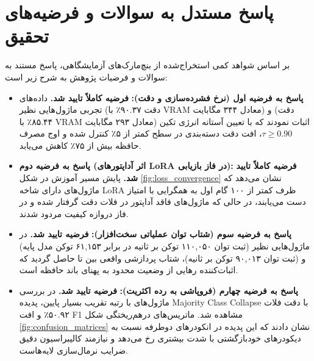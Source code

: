 \documentclass[12pt,a4paper]{report}
\theoremstyle{definition}
\begin{document}
\section{پاسخ مستدل به سوالات و فرضیه‌های تحقیق}
بر اساس شواهد کمی استخراج‌شده از بنچ‌مارک‌های آزمایشگاهی، پاسخ مستند به سوالات و فرضیات پژوهش به شرح زیر است:

\begin{itemize}
    \item \textbf{پاسخ به فرضیه اول (نرخ فشرده‌سازی و دقت):}
    \textbf{فرضیه کاملاً تایید شد.} داده‌های تجربی ماژول‌هایی نظیر  (دقت ۹۰.۳۷٪ با VRAM معادل ۳۴۴ مگابایت) و  (دقت ۸۵.۴۴٪ با VRAM معادل ۲۹۳ مگابایت) اثبات نمودند که با تعیین آستانه انرژی تکین $\tau \ge 0.90$، افت دقت دسته‌بندی در سطح کمتر از ۵٪ کنترل شده و اوج مصرف حافظه بیش از ۷۵٪ کاهش می‌یابد.

    \item \textbf{پاسخ به فرضیه دوم (اثر آداپتورهای LoRA در فاز بازیابی):}
    \textbf{فرضیه کاملاً تایید شد.} پایش مسیر آموزش در شکل \ref{fig:loss_convergence} نشان می‌دهد که ماژول‌های دارای شاخه LoRA ظرف کمتر از ۱۰۰ گام اول به همگرایی با امتیاز  دست می‌یابند، در حالی که ماژول‌های فاقد آداپتور در فلات دقت گرفتار شده و در فاز دروازه کیفیت مردود شدند.

    \item \textbf{پاسخ به فرضیه سوم (شتاب توان عملیاتی سخت‌افزار):}
    \textbf{فرضیه تایید شد.} در ماژول‌هایی نظیر  (ثبت توان ۱۱۰,۰۵۰ توکن بر ثانیه در برابر ۶۱,۱۵۳ توکن مدل پایه) و  (ثبت توان ۹۰,۰۱۳ توکن بر ثانیه)، شتاب پردازشی واقعی بین  تا  حاصل گردید که اثبات‌کننده رهایی از وضعیت محدود به پهنای باند حافظه  است.

    \item \textbf{پاسخ به فرضیه چهارم (فروپاشی به رده اکثریت):}
    \textbf{فرضیه تایید شد.} در بررسی ماژول‌های با رتبه تقریب بسیار پایین، پدیده Majority Class Collapse با دقت فلات ۵۰.۹۲٪ و افت F1 مشاهده شد. ماتریس‌های درهم‌ریختگی شکل \ref{fig:confusion_matrices} نشان دادند که این پدیده در انکودرهای دوطرفه نسبت به دیکودرهای خودبازگشتی با شدت بیشتری رخ می‌دهد و نیازمند کالیبراسیون دقیق ضرایب نرمال‌سازی لایه‌هاست.
\end{itemize}
\end{document}
